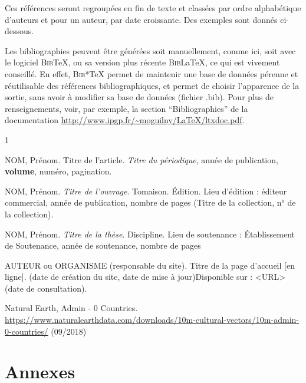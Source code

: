 \documentclass{ipgplicence}
\begin{document}
Ces références seront regroupées en fin de texte et classées par ordre alphabétique d'auteurs et pour un auteur, par date croissante. Des exemples sont donnés ci-dessous.

Les bibliographies peuvent être générées soit manuellement, comme ici, soit avec le logiciel \textsc{Bib}\TeX, ou sa version plus récente \textsc{Bib}\LaTeX, ce qui est vivement conseillé. En effet, \textsc{Bib}*\TeX{} permet de maintenir une base de données pérenne et réutilisable des références bibliographiques, et permet de choisir l’apparence de la sortie, sans avoir à modifier sa base de données (fichier .bib). Pour plus de renseignements, voir, par exemple, la section “Bibliographies”  de la documentation
\url{http://www.ipgp.fr/~moguilny/LaTeX/ltxdoc.pdf}.



\begin{thebibliography}{1}



 NOM, Prénom. Titre de l’article. \textit{Titre du périodique}, année de publication, \textbf{volume}, numéro, pagination. 

 NOM, Prénom. \textit{Titre de l’ouvrage}. Tomaison. Édition. Lieu d’édition : éditeur commercial, année de publication, nombre de pages (Titre de la collection, n° de la collection).

 NOM, Prénom. \textit{Titre de la thèse}. Discipline. Lieu de soutenance : Établissement de Soutenance, année de soutenance, nombre de pages

 AUTEUR ou ORGANISME (responsable du site). Titre de la page d’accueil [en ligne]. (date de création du site, date de mise à jour)Disponible sur : <URL> (date de consultation).

 Natural Earth, Admin - 0 Countries. \href{https://www.naturalearthdata.com/downloads/10m-cultural-vectors/10m-admin-0-countries/}{https://www.naturalearthdata.com/downloads/10m-cultural-vectors/10m-admin-0-countries/} (09/2018)

\end{thebibliography}

\appendix

\section{Annexes}
\end{document}
